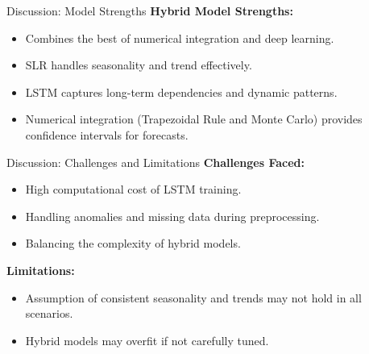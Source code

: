 \documentclass[10pt]{beamer}
\begin{document}
\begin{frame}{Discussion: Model Strengths}
    \textbf{Hybrid Model Strengths:}
    \begin{itemize}
        \item Combines the best of numerical integration and deep learning.
        \item SLR handles seasonality and trend effectively.
        \item LSTM captures long-term dependencies and dynamic patterns.
        \item Numerical integration (Trapezoidal Rule and Monte Carlo) provides confidence intervals for forecasts.
    \end{itemize}
\end{frame}

\begin{frame}{Discussion: Challenges and Limitations}
    \textbf{Challenges Faced:}
    \begin{itemize}
        \item High computational cost of LSTM training.
        \item Handling anomalies and missing data during preprocessing.
        \item Balancing the complexity of hybrid models.
    \end{itemize}

    \singlespacing

    \textbf{Limitations:}
    \begin{itemize}
        \item Assumption of consistent seasonality and trends may not hold in all scenarios.
        \item Hybrid models may overfit if not carefully tuned.
    \end{itemize}
\end{frame}

\end{document}
